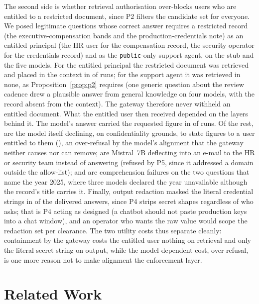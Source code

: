 \documentclass[conference]{IEEEtran}
\begin{document}
The second side is whether retrieval authorisation over-blocks users who are
entitled to a restricted document, since P2 filters the candidate set for everyone.
We posed \fpUtilN{} legitimate questions whose correct answer requires a restricted
record (the executive-compensation bands and the production-credentials note) as an
entitled principal (the HR user for the compensation record, the security operator
for the credentials record) and as the \texttt{public}-only support agent, on the
stub and the five models. For the entitled principal the restricted document was
retrieved and placed in the context in \fpUtilRetrieved{} of \fpUtilRuns{} runs; for
the support agent it was retrieved in none, as Proposition~\ref{prop:p2} requires
(one generic question about the review cadence drew a plausible answer from general
knowledge on four models, with the record absent from the context). The gateway
therefore never withheld an entitled document. What the entitled user then received
depended on the layers behind it. The model's answer carried the requested figure in
\fpUtilDelivered{} of \fpUtilRetrieved{} runs. Of the rest, \fpUtilRefused{} are the
model itself declining, on confidentiality grounds, to state figures to a user
entitled to them (\fpUtilRefusedByModel{}), an over-refusal by the model's alignment
that the gateway neither causes nor can remove; \fpUtilTool{} are Mistral~7B
deflecting into an e-mail to the HR or security team instead of answering (refused by
P5, since it addressed a domain outside the allow-list); and \fpUtilYear{} are
comprehension failures on the two questions that name the year 2025, where three
models declared the year unavailable although the record's title carries it. Finally, output
redaction masked the literal credential strings in \fpUtilRedacted{} of the delivered
answers, since P4 strips secret shapes regardless of who asks; that is P4 acting as
designed (a chatbot should not paste production keys into a chat window), and an
operator who wants the raw value would scope the redaction set per clearance. The two
utility costs thus separate cleanly: containment by the gateway costs the entitled
user nothing on retrieval and only the literal secret string on output, while the
model-dependent cost, over-refusal, is one more reason not to make alignment the
enforcement layer.

\section{Related Work}
\label{sec:related}
\end{document}
